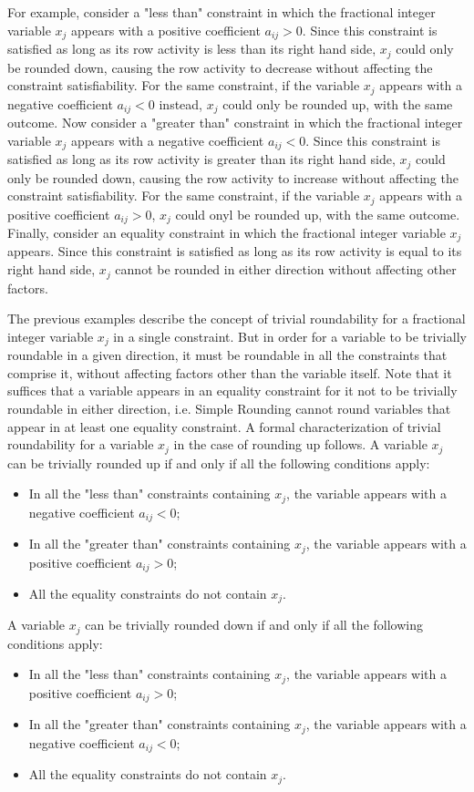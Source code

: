 \documentclass[a4paper,12pt]{book}
\begin{document}
For example, consider a "less than" constraint in which the fractional integer variable $x_j$ appears with a positive coefficient $a_{ij} > 0$. Since this constraint is satisfied as long as its row activity is less than its right hand side, $x_j$ could only be rounded down, causing the row activity to decrease without affecting the constraint satisfiability. For the same constraint, if the variable $x_j$ appears with a negative coefficient $a_{ij} < 0$ instead, $x_j$ could only be rounded up, with the same outcome.
Now consider a "greater than" constraint in which the fractional integer variable $x_j$ appears with a negative coefficient $a_{ij} < 0$. Since this constraint is satisfied as long as its row activity is greater than its right hand side, $x_j$ could only be rounded down, causing the row activity to increase without affecting the constraint satisfiability. For the same constraint, if the variable $x_j$ appears with a positive coefficient $a_{ij} > 0$, $x_j$ could onyl be rounded up, with the same outcome.
Finally, consider an equality constraint in which the fractional integer variable $x_j$ appears. Since this constraint is satisfied as long as its row activity is equal to its right hand side, $x_j$ cannot be rounded in either direction without affecting other factors. \par

The previous examples describe the concept of trivial roundability for a fractional integer variable $x_j$ in a single constraint. But in order for a variable to be trivially roundable in a given direction, it must be roundable in all the constraints that comprise it, without affecting factors other than the variable itself. 
Note that it suffices that a variable appears in an equality constraint for it not to be trivially roundable in either direction, i.e. Simple Rounding cannot round variables that appear in at least one equality constraint.
A formal characterization of trivial roundability for a variable $x_j$ in the case of rounding up follows.
A variable $x_j$ can be trivially rounded up if and only if all the following conditions apply:
\begin{itemize}
	\item In all the "less than" constraints containing $x_j$, the variable appears with a negative coefficient $a_{ij} < 0$;
	\item In all the "greater than" constraints containing $x_j$, the variable appears with a positive coefficient $a_{ij} > 0$;
	\item All the equality constraints do not contain $x_j$.
\end{itemize}
A variable $x_j$ can be trivially rounded down if and only if all the following conditions apply:
\begin{itemize}
	\item In all the "less than" constraints containing $x_j$, the variable appears with a positive coefficient $a_{ij} > 0$;
	\item In all the "greater than" constraints containing $x_j$, the variable appears with a negative coefficient $a_{ij} < 0$;
	\item All the equality constraints do not contain $x_j$.
\end{itemize}
\par
\end{document}

